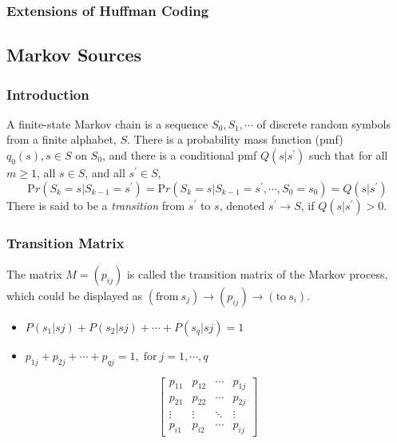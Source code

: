 \documentclass{article}
\begin{document}
\subsubsection{Extensions of Huffman Coding}

\subsection{Markov Sources}

\subsubsection{Introduction}

A finite-state Markov chain is a sequence $S_{0},S_{1}, \cdots$ of discrete random sym­bols from a finite alphabet, $S$. There is a probability mass function (pmf) $q_{0}(s), s \in S$ on $S_{0}$, and there is a conditional pmf $Q(s|s^{\prime})$ such that for all $m \geq 1$, all $s \in S$, and all $s^{\prime} \in S$,
    \[{\mathrm Pr}(S_{k}=s|S_{k-1}=s^{\prime})={\mathrm Pr}(S_{k}=s|S_{k-1}=s^{\prime},\cdots,S_{0}=s_{0})=Q(s|s^{\prime})\]
    There is said to be a \emph{transition} from $s^{\prime}$ to $s$, denoted $s^{\prime} \to S$, if $Q(s|s^{\prime})>0$. \cite{mitCh2}

\subsubsection{Transition Matrix}

The matrix $M = (p_{ij})$ is called the transition matrix of the Markov process, which could be displayed as $(\mathrm{from}\ s_{j}) \rightarrow (p_{ij}) \rightarrow (\mathrm{to}\ s_{i})$.

\begin{itemize}
    \item \quad $P(s_{1}|s{j}) + P(s_{2}|s{j}) + \cdots + P(s_{q}|s{j}) = 1$
    \item \quad $p_{1j} + p_{2j} + \cdots + p_{qj} = 1, \; \mathrm{for}\ j = 1, \cdots, q$
\end{itemize}

\[
\begin{bmatrix}
    p_{11} & p_{12} & \cdots & p_{1j} \\
    p_{21} & p_{22} & \cdots & p_{2j} \\
    \vdots & \vdots & \ddots & \vdots \\
    p_{i1} & p_{i2} & \cdots & p_{ij}
\end{bmatrix}
\]
\end{document}
